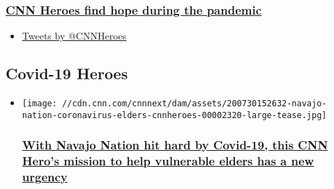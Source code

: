\begin{itemize}
{  \subsubsection{\texorpdfstring{\href{/videos/tv/2020/04/02/coronavirus-innovation-messages-of-hope.cnn}{CNN
  Heroes find hope during the
  pandemic}}{CNN Heroes find hope during the pandemic}}\label{cnn-heroes-find-hope-during-the-pandemic}}
\end{itemize}

\begin{itemize}
\item
  \href{https://twitter.com/CNNHeroes}{Tweets by @CNNHeroes}
\end{itemize}

\hypertarget{covid-19-heroes-}{%
\subsection{Covid-19 Heroes~}\label{covid-19-heroes-}}

\begin{itemize}
\item
  \href{/2020/07/30/us/navajo-nation-coronavirus-elders-cnnheroes/index.html}{}

  \texttt{[image: //cdn.cnn.com/cnnnext/dam/assets/200730152632-navajo-nation-coronavirus-elders-cnnheroes-00002320-large-tease.jpg]}

  \hypertarget{with-navajo-nation-hit-hard-by-covid-19-this-cnn-heros-mission-to-help-vulnerable-elders-has-a-new-urgency}{%
  \subsubsection{\texorpdfstring{\href{/2020/07/30/us/navajo-nation-coronavirus-elders-cnnheroes/index.html}{With
  Navajo Nation hit hard by Covid-19, this CNN Hero's mission to help
  vulnerable elders has a new
  urgency}}{With Navajo Nation hit hard by Covid-19, this CNN Hero's mission to help vulnerable elders has a new urgency}}\label{with-navajo-nation-hit-hard-by-covid-19-this-cnn-heros-mission-to-help-vulnerable-elders-has-a-new-urgency}}
\end{itemize}

